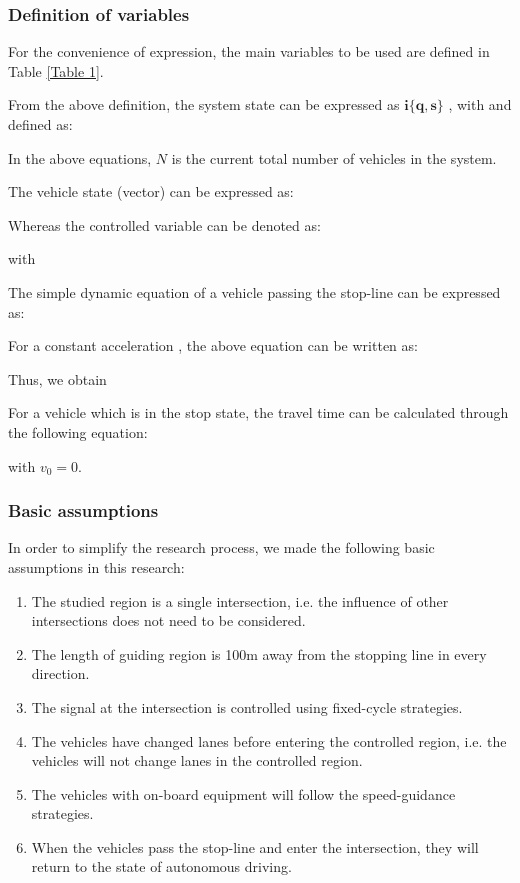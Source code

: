 \documentclass[10.5pt,compsoc]{TsT}
\theoremstyle{mystyle}
\renewcommand{\labelenumi}{(\arabic{enumi})}
\begin{document}
{\subsubsection{Definition of variables}

For the convenience of expression, the main variables to be used are
defined in Table \ref{Table 1}.

From the above definition, the system state can be expressed as $\mathbf{i\{q,s\}}$ , with
and defined as:

In the above equations, $N$ is the current total number of vehicles
in the system.

The vehicle state (vector) can be expressed as:

Whereas the controlled variable can be denoted as:

with

The simple dynamic equation of a vehicle passing the stop-line can be
expressed as:

For a constant acceleration , the above equation can be written as:

Thus, we obtain

For a vehicle which is in the stop state, the travel time can be
calculated through the following equation:

with $v_0=0$.

\subsubsection{Basic assumptions}
In order to simplify the research process, we made the following basic
assumptions in this research:

\begin{enumerate}
\def\labelenumi{\alph{enumi})}
\item
  The studied region is a single intersection, i.e. the influence of
  other intersections does not need to be considered.
\item
  The length of guiding region is 100m away from the stopping line in
  every direction.
\item
  The signal at the intersection is controlled using fixed-cycle
  strategies.
\item
  The vehicles have changed lanes before entering the controlled region,
  i.e. the vehicles will not change lanes in the controlled region.
\item
  The vehicles with on-board equipment will follow the speed-guidance
  strategies.
\item
  When the vehicles pass the stop-line and enter the intersection, they
  will return to the state of autonomous driving.
\end{enumerate}

}
\end{document}
